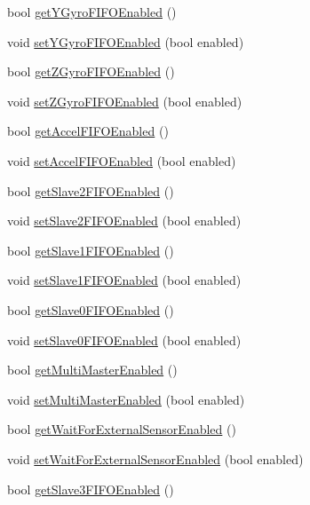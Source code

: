 \begin{DoxyCompactItemize}
bool \hyperlink{classMPU6050_a86c85d5b5c93df82394435b868e17463}{get\+Y\+Gyro\+F\+I\+F\+O\+Enabled} ()
\item 
void \hyperlink{classMPU6050_a16eb12bbf07bc17a9d852941d834175e}{set\+Y\+Gyro\+F\+I\+F\+O\+Enabled} (bool enabled)
\item 
bool \hyperlink{classMPU6050_adbbbd131c74f37dd545403633eb317ff}{get\+Z\+Gyro\+F\+I\+F\+O\+Enabled} ()
\item 
void \hyperlink{classMPU6050_af5b5bc39b66466ba910f6eef1259444c}{set\+Z\+Gyro\+F\+I\+F\+O\+Enabled} (bool enabled)
\item 
bool \hyperlink{classMPU6050_ace244415128ad7a38293ad6808b7face}{get\+Accel\+F\+I\+F\+O\+Enabled} ()
\item 
void \hyperlink{classMPU6050_afccbee85f5cdc95098f6d62d8d417c3f}{set\+Accel\+F\+I\+F\+O\+Enabled} (bool enabled)
\item 
bool \hyperlink{classMPU6050_a3c2e29508607a655221a2fa4f4219b4d}{get\+Slave2\+F\+I\+F\+O\+Enabled} ()
\item 
void \hyperlink{classMPU6050_a38a10ac4f30b96718ec021dc0db8587b}{set\+Slave2\+F\+I\+F\+O\+Enabled} (bool enabled)
\item 
bool \hyperlink{classMPU6050_afd6a9b55a589c83c9a0fb0b5b2a88234}{get\+Slave1\+F\+I\+F\+O\+Enabled} ()
\item 
void \hyperlink{classMPU6050_a5d432fa2fb8b2227f50aa5c7b5befb66}{set\+Slave1\+F\+I\+F\+O\+Enabled} (bool enabled)
\item 
bool \hyperlink{classMPU6050_a6aa7aa2e3fac06f8b5ab9ee127255a5e}{get\+Slave0\+F\+I\+F\+O\+Enabled} ()
\item 
void \hyperlink{classMPU6050_a97fbf27e1b827f9dfc3c28ff376b54c4}{set\+Slave0\+F\+I\+F\+O\+Enabled} (bool enabled)
\item 
bool \hyperlink{classMPU6050_aa88483068837bd9bc9c9f6c59a7a79b7}{get\+Multi\+Master\+Enabled} ()
\item 
void \hyperlink{classMPU6050_a039f5724974c5bf3f373ed9be031441c}{set\+Multi\+Master\+Enabled} (bool enabled)
\item 
bool \hyperlink{classMPU6050_a4e2ebda47b85b4c5463f041c790bf5c0}{get\+Wait\+For\+External\+Sensor\+Enabled} ()
\item 
void \hyperlink{classMPU6050_a20dc4bdedbe1550580c28a6d090291be}{set\+Wait\+For\+External\+Sensor\+Enabled} (bool enabled)
\item 
bool \hyperlink{classMPU6050_a9d75ec63e2320ecfb84a2b082397f900}{get\+Slave3\+F\+I\+F\+O\+Enabled} ()
\item 

\end{DoxyCompactItemize}
